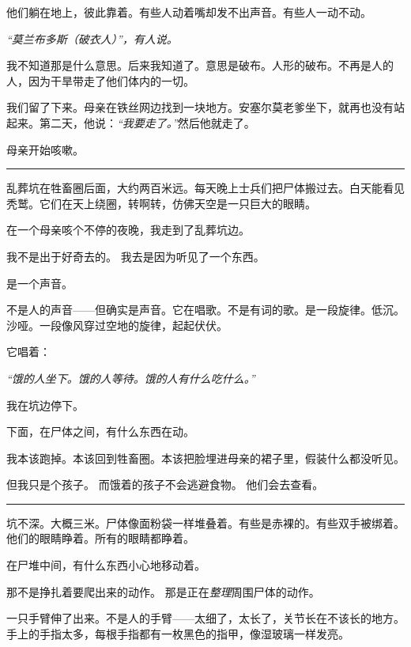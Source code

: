 \noindent 他们躺在地上，彼此靠着。有些人动着嘴却发不出声音。有些人一动不动。

\noindent \textit{“莫兰布多斯（破衣人）”，有人说。}

\noindent 我不知道那是什么意思。后来我知道了。意思是破布。人形的破布。不再是人的人，因为干旱带走了他们体内的一切。

\noindent 我们留了下来。母亲在铁丝网边找到一块地方。安塞尔莫老爹坐下，就再也没有站起来。第二天，他说：\textit{“我要走了。”}然后他就走了。

\noindent 母亲开始咳嗽。

\vspace{0.5em}\noindent\rule{\textwidth}{0.5pt}\vspace{0.5em}

\noindent 乱葬坑在牲畜圈后面，大约两百米远。每天晚上士兵们把尸体搬过去。白天能看见秃鹫。它们在天上绕圈，转啊转，仿佛天空是一只巨大的眼睛。

\noindent 在一个母亲咳个不停的夜晚，我走到了乱葬坑边。

\noindent 我不是出于好奇去的。
我去是因为听见了一个东西。

\noindent 是一个声音。

\noindent 不是人的声音——但确实是声音。它在唱歌。不是有词的歌。是一段旋律。低沉。沙哑。一段像风穿过空地的旋律，起起伏伏。

\noindent 它唱着：

\noindent \textit{“饿的人坐下。饿的人等待。饿的人有什么吃什么。”}

\noindent 我在坑边停下。

\noindent 下面，在尸体之间，有什么东西在动。

\noindent 我本该跑掉。本该回到牲畜圈。本该把脸埋进母亲的裙子里，假装什么都没听见。

\noindent 但我只是个孩子。
而饿着的孩子不会逃避食物。
他们会去查看。

\vspace{0.5em}\noindent\rule{\textwidth}{0.5pt}\vspace{0.5em}

\noindent 坑不深。大概三米。尸体像面粉袋一样堆叠着。有些是赤裸的。有些双手被绑着。他们的眼睛睁着。所有的眼睛都睁着。

\noindent 在尸堆中间，有什么东西小心地移动着。

\noindent 那不是挣扎着要爬出来的动作。
那是正在\textit{整理}周围尸体的动作。

\noindent 一只手臂伸了出来。不是人的手臂——太细了，太长了，关节长在不该长的地方。手上的手指太多，每根手指都有一枚黑色的指甲，像湿玻璃一样发亮。

